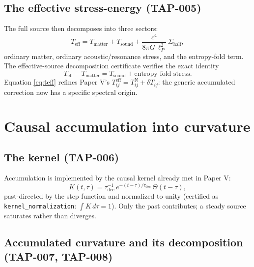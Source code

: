 \documentclass[11pt]{article}
\theoremstyle{remark}
\begin{document}
\subsection{The effective stress-energy (TAP-005)}

The full source then decomposes into three sectors:
\begin{equation}
T_{\mathrm{eff}} = T_{\mathrm{matter}} + T_{\mathrm{sound}} + \frac{c^4}{8\pi G\, \ell_P^2}\, \Sigma_{\mathrm{half}},
\label{eq:teff}
\end{equation}
ordinary matter, ordinary acoustic/resonance stress, and the entropy-fold term. The effective-source decomposition certificate verifies the exact identity
\begin{equation}
T_{\mathrm{eff}} - T_{\mathrm{matter}}
= T_{\mathrm{sound}} + \text{entropy-fold stress}.
\end{equation}
Equation \eqref{eq:teff} refines Paper V's $T^{\mathrm{eff}}_{ij} = T^{\mathrm{N}}_{ij} + \delta T_{ij}$: the generic accumulated correction now has a specific spectral origin.

\section{Causal accumulation into curvature}
\label{sec:accumulation}

\subsection{The kernel (TAP-006)}

Accumulation is implemented by the causal kernel already met in Paper V:
\begin{equation}
K(t, \tau) = \tau_{\mathrm{dec}}^{-1}\, e^{-(t - \tau)/\tau_{\mathrm{dec}}}\, \Theta(t - \tau),
\label{eq:kernel}
\end{equation}
past-directed by the step function and normalized to unity (certified as \texttt{kernel\_normalization}: $\int K\, d\tau = 1$). Only the past contributes; a steady source saturates rather than diverges.

\subsection{Accumulated curvature and its decomposition (TAP-007, TAP-008)}
\end{document}
